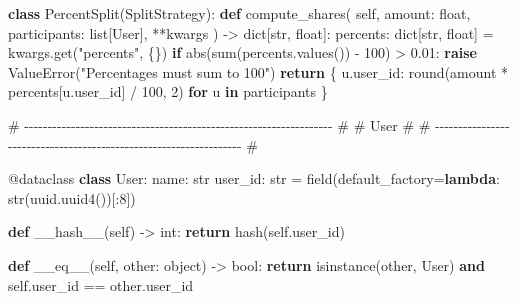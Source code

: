 \documentclass[11pt]{article}
\newenvironment{Shaded}{\begin{snugshade}}{\end{snugshade}}
\newcommand{\AttributeTok}[1]{\textcolor[rgb]{0.16,0.50,0.73}{#1}}
\newcommand{\BuiltInTok}[1]{\textcolor[rgb]{0.50,0.55,0.55}{#1}}
\newcommand{\CommentTok}[1]{\textcolor[rgb]{0.48,0.49,0.49}{#1}}
\newcommand{\ControlFlowTok}[1]{\textcolor[rgb]{0.99,0.74,0.29}{\textbf{#1}}}
\newcommand{\DecValTok}[1]{\textcolor[rgb]{0.96,0.45,0.00}{#1}}
\newcommand{\FloatTok}[1]{\textcolor[rgb]{0.96,0.45,0.00}{#1}}
\newcommand{\FunctionTok}[1]{\textcolor[rgb]{0.56,0.27,0.68}{#1}}
\newcommand{\KeywordTok}[1]{\textcolor[rgb]{0.81,0.81,0.76}{\textbf{#1}}}
\newcommand{\NormalTok}[1]{\textcolor[rgb]{0.81,0.81,0.76}{#1}}
\newcommand{\OperatorTok}[1]{\textcolor[rgb]{0.81,0.81,0.76}{#1}}
\newcommand{\PreprocessorTok}[1]{\textcolor[rgb]{0.15,0.68,0.38}{#1}}
\newcommand{\StringTok}[1]{\textcolor[rgb]{0.96,0.31,0.31}{#1}}
\newcommand{\VariableTok}[1]{\textcolor[rgb]{0.15,0.68,0.68}{#1}}
\begin{document}
\begin{Shaded}
\begin{Highlighting}[]
\KeywordTok{class}\NormalTok{ PercentSplit(SplitStrategy):}
    \KeywordTok{def}\NormalTok{ compute\_shares(}
        \VariableTok{self}\NormalTok{, amount: }\BuiltInTok{float}\NormalTok{, participants: }\BuiltInTok{list}\NormalTok{[User], }\OperatorTok{**}\NormalTok{kwargs}
\NormalTok{    ) }\OperatorTok{{-}\textgreater{}} \BuiltInTok{dict}\NormalTok{[}\BuiltInTok{str}\NormalTok{, }\BuiltInTok{float}\NormalTok{]:}
\NormalTok{        percents: }\BuiltInTok{dict}\NormalTok{[}\BuiltInTok{str}\NormalTok{, }\BuiltInTok{float}\NormalTok{] }\OperatorTok{=}\NormalTok{ kwargs.get(}\StringTok{"percents"}\NormalTok{, \{\})}
        \ControlFlowTok{if} \BuiltInTok{abs}\NormalTok{(}\BuiltInTok{sum}\NormalTok{(percents.values()) }\OperatorTok{{-}} \DecValTok{100}\NormalTok{) }\OperatorTok{\textgreater{}} \FloatTok{0.01}\NormalTok{:}
            \ControlFlowTok{raise} \PreprocessorTok{ValueError}\NormalTok{(}\StringTok{"Percentages must sum to 100"}\NormalTok{)}
        \ControlFlowTok{return}\NormalTok{ \{}
\NormalTok{            u.user\_id: }\BuiltInTok{round}\NormalTok{(amount }\OperatorTok{*}\NormalTok{ percents[u.user\_id] }\OperatorTok{/} \DecValTok{100}\NormalTok{, }\DecValTok{2}\NormalTok{)}
            \ControlFlowTok{for}\NormalTok{ u }\KeywordTok{in}\NormalTok{ participants}
\NormalTok{        \}}


\CommentTok{\# {-}{-}{-}{-}{-}{-}{-}{-}{-}{-}{-}{-}{-}{-}{-}{-}{-}{-}{-}{-}{-}{-}{-}{-}{-}{-}{-}{-}{-}{-}{-}{-}{-}{-}{-}{-}{-}{-}{-}{-}{-}{-}{-}{-}{-}{-}{-}{-}{-}{-}{-}{-}{-}{-}{-}{-}{-}{-}{-}{-}{-}{-}{-}{-}{-}{-} \#}
\CommentTok{\# User                                                                \#}
\CommentTok{\# {-}{-}{-}{-}{-}{-}{-}{-}{-}{-}{-}{-}{-}{-}{-}{-}{-}{-}{-}{-}{-}{-}{-}{-}{-}{-}{-}{-}{-}{-}{-}{-}{-}{-}{-}{-}{-}{-}{-}{-}{-}{-}{-}{-}{-}{-}{-}{-}{-}{-}{-}{-}{-}{-}{-}{-}{-}{-}{-}{-}{-}{-}{-}{-}{-}{-} \#}

\AttributeTok{@dataclass}
\KeywordTok{class}\NormalTok{ User:}
\NormalTok{    name: }\BuiltInTok{str}
\NormalTok{    user\_id: }\BuiltInTok{str} \OperatorTok{=}\NormalTok{ field(default\_factory}\OperatorTok{=}\KeywordTok{lambda}\NormalTok{: }\BuiltInTok{str}\NormalTok{(uuid.uuid4())[:}\DecValTok{8}\NormalTok{])}

    \KeywordTok{def} \FunctionTok{\_\_hash\_\_}\NormalTok{(}\VariableTok{self}\NormalTok{) }\OperatorTok{{-}\textgreater{}} \BuiltInTok{int}\NormalTok{:}
        \ControlFlowTok{return} \BuiltInTok{hash}\NormalTok{(}\VariableTok{self}\NormalTok{.user\_id)}

    \KeywordTok{def} \FunctionTok{\_\_eq\_\_}\NormalTok{(}\VariableTok{self}\NormalTok{, other: }\BuiltInTok{object}\NormalTok{) }\OperatorTok{{-}\textgreater{}} \BuiltInTok{bool}\NormalTok{:}
        \ControlFlowTok{return} \BuiltInTok{isinstance}\NormalTok{(other, User) }\KeywordTok{and} \VariableTok{self}\NormalTok{.user\_id }\OperatorTok{==}\NormalTok{ other.user\_id}


\end{Highlighting}
\end{Shaded}
\end{document}
